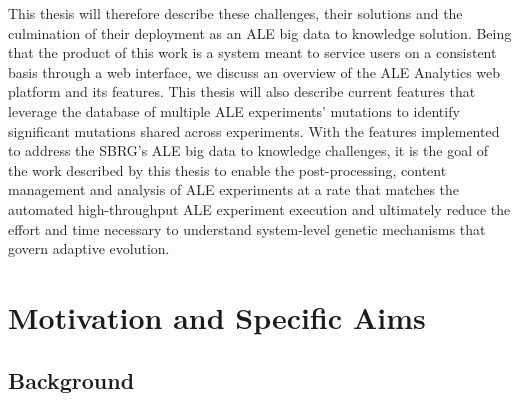 \documentclass[12pt,final,masters,chapterheads]{ucsd}  %
\begin{document}
This thesis will therefore describe these challenges, their solutions and the culmination of their deployment as an ALE big data to knowledge solution. Being that the product of this work is a system meant to service users on a consistent basis through a web interface, we discuss an overview of the ALE Analytics web platform and its features. This thesis will also describe current features that leverage the database of multiple ALE experiments' mutations to identify significant mutations shared across experiments. With the features implemented to address the SBRG's ALE big data to knowledge challenges, it is the goal of the work described by this thesis to enable the post-processing, content management and analysis of ALE experiments at a rate that matches the automated high-throughput ALE experiment execution and ultimately reduce the effort and time necessary to understand system-level genetic mechanisms that govern adaptive evolution.
%
%
\chapter{Motivation and Specific Aims}
%
%
%
%
%
%
%
%
\section{Background}
\end{document}
